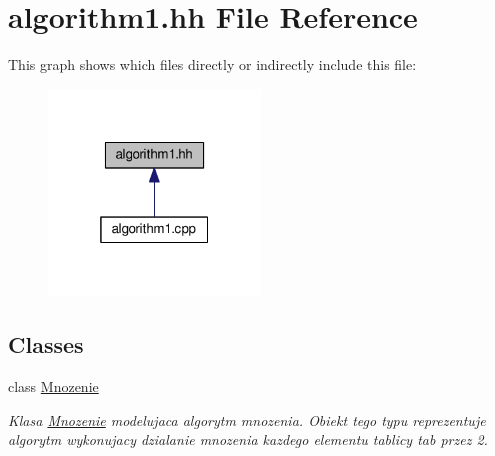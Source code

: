 \hypertarget{algorithm1_8hh}{}\section{algorithm1.\+hh File Reference}
\label{algorithm1_8hh}
This graph shows which files directly or indirectly include this file\+:\nopagebreak
\begin{figure}[H]
\begin{center}
\leavevmode
\includegraphics[width=160pt]{algorithm1_8hh__dep__incl}
\end{center}
\end{figure}
\subsection*{Classes}
\begin{DoxyCompactItemize}
\item 
class \hyperlink{class_mnozenie}{Mnozenie}
\begin{DoxyCompactList}\small\item\em Klasa \hyperlink{class_mnozenie}{Mnozenie} modelujaca algorytm mnozenia. Obiekt tego typu reprezentuje algorytm wykonujacy dzialanie mnozenia kazdego elementu tablicy tab przez 2. \end{DoxyCompactList}\end{DoxyCompactItemize}
